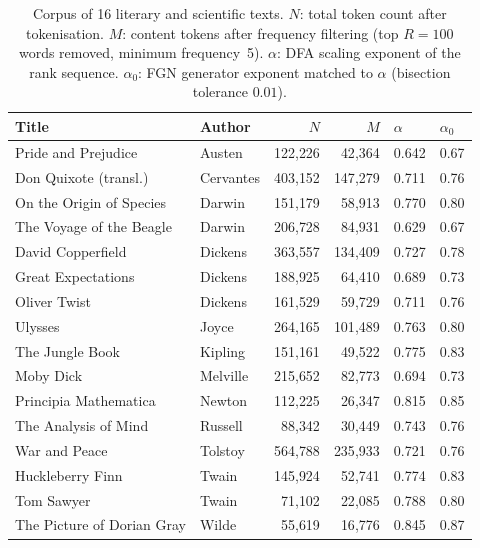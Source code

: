 \documentclass[preprint]{elsarticle}
\begin{document}
\begin{table}[t]
\centering
\caption{Corpus of 16 literary and scientific texts.
$N$: total token count after tokenisation.
$M$: content tokens after frequency filtering
(top $R=100$ words removed, minimum frequency~5).
$\alpha$: DFA scaling exponent of the rank sequence.
$\alpha_0$: FGN generator exponent matched to $\alpha$ (bisection
tolerance $0.01$).}
\label{tab:corpus}
\small
\begin{tabular}{llrrll}
\toprule
Title & Author & $N$ & $M$ & $\alpha$ & $\alpha_0$ \\
\midrule
Pride and Prejudice        & Austen    & 122{,}226 &  42{,}364 & 0.642 & 0.67 \\
Don Quixote (transl.)      & Cervantes & 403{,}152 & 147{,}279 & 0.711 & 0.76 \\
On the Origin of Species   & Darwin    & 151{,}179 &  58{,}913 & 0.770 & 0.80 \\
The Voyage of the Beagle   & Darwin    & 206{,}728 &  84{,}931 & 0.629 & 0.67 \\
David Copperfield          & Dickens   & 363{,}557 & 134{,}409 & 0.727 & 0.78 \\
Great Expectations         & Dickens   & 188{,}925 &  64{,}410 & 0.689 & 0.73 \\
Oliver Twist               & Dickens   & 161{,}529 &  59{,}729 & 0.711 & 0.76 \\
Ulysses                    & Joyce     & 264{,}165 & 101{,}489 & 0.763 & 0.80 \\
The Jungle Book            & Kipling   & 151{,}161 &  49{,}522 & 0.775 & 0.83 \\
Moby Dick                  & Melville  & 215{,}652 &  82{,}773 & 0.694 & 0.73 \\
Principia Mathematica      & Newton    & 112{,}225 &  26{,}347 & 0.815 & 0.85 \\
The Analysis of Mind       & Russell   &  88{,}342 &  30{,}449 & 0.743 & 0.76 \\
War and Peace              & Tolstoy   & 564{,}788 & 235{,}933 & 0.721 & 0.76 \\
Huckleberry Finn           & Twain     & 145{,}924 &  52{,}741 & 0.774 & 0.83 \\
Tom Sawyer                 & Twain     &  71{,}102 &  22{,}085 & 0.788 & 0.80 \\
The Picture of Dorian Gray & Wilde     &  55{,}619 &  16{,}776 & 0.845 & 0.87 \\
\bottomrule
\end{tabular}
\end{table}
\end{document}
